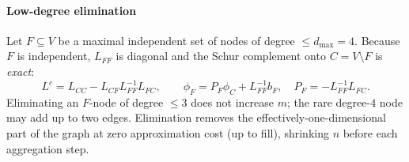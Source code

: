 \documentclass{siamart220329}
\begin{document}
\paragraph{Low-degree elimination} Let $F\subseteq V$ be a maximal independent set of
nodes of degree $\le d_{\max}=4$. Because $F$ is independent, $L_{FF}$ is diagonal and the
Schur complement onto $C=V\setminus F$ is \emph{exact}:
\begin{equation}\label{eq:elim}
L^c=L_{CC}-L_{CF}L_{FF}^{-1}L_{FC},\qquad
\phi_F=P_F\phi_C+L_{FF}^{-1}b_F,\quad P_F=-L_{FF}^{-1}L_{FC}.
\end{equation}
Eliminating an $F$-node of degree $\le 3$ does not increase $m$; the rare degree-$4$ node
may add up to two edges. Elimination removes the effectively-one-dimensional part of the graph at
zero approximation cost (up to fill), shrinking $n$ before each aggregation step.
\end{document}

